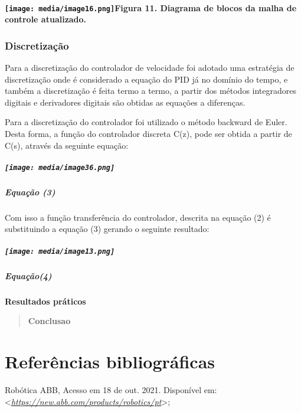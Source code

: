 \documentclass[]{article}
\let\oldparagraph\paragraph
\renewcommand{\paragraph}[1]{\oldparagraph{#1}\mbox{}}
\let\oldsubparagraph\subparagraph
\renewcommand{\subparagraph}[1]{\oldsubparagraph{#1}\mbox{}}
\begin{document}
\paragraph{\texorpdfstring{\protect\texttt{[image: media/image16.png]}Figura
11. Diagrama de blocos da malha de controle
atualizado.}{Figura 11. Diagrama de blocos da malha de controle atualizado.}}\label{figura-11.-diagrama-de-blocos-da-malha-de-controle-atualizado.}

\subsubsection{Discretização}\label{discretizauxe7uxe3o}

Para a discretização do controlador de velocidade foi adotado uma
estratégia de discretização onde é considerado a equação do PID já no
domínio do tempo, e também a discretização é feita termo a termo, a
partir dos métodos integradores digitais e derivadores digitais são
obtidas as equações a diferenças.

Para a discretização do controlador foi utilizado o método backward de
Euler. Desta forma, a função do controlador discreta C(z), pode ser
obtida a partir de C(s), através da seguinte equação:

\subparagraph{\texorpdfstring{\protect\texttt{[image: media/image36.png]}
}{ }}\label{section-1}

\subparagraph{Equação (3)}\label{equauxe7uxe3o-3}

Com isso a função transferência do controlador, descrita na equação (2)
é substituindo a equação (3) gerando o seguinte resultado:

\subparagraph{\texorpdfstring{\protect\texttt{[image: media/image13.png]}
}{ }}\label{section-2}

\subparagraph{Equação(4)}\label{equauxe7uxe3o4}

\textbf{Resultados práticos}

\begin{quote}
\textbf{Conclusao}
\end{quote}

\section{Referências
bibliográficas}\label{referuxeancias-bibliogruxe1ficas}

Robótica ABB, Acesso em 18 de out. 2021. Disponível em:
\textless{}\href{https://new.abb.com/products/robotics/pt}{\emph{https://new.abb.com/products/robotics/pt}}\textgreater{};
\end{document}
